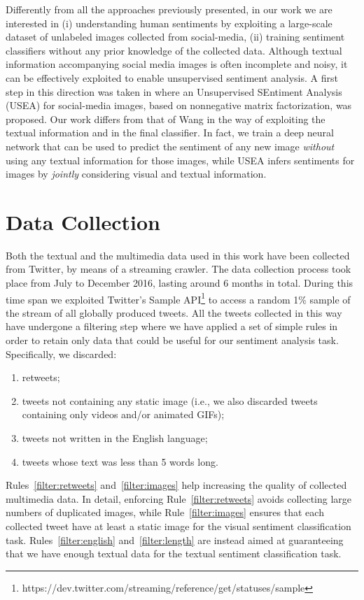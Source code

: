 Differently from all the approaches previously presented, in our work we are interested in (i) understanding human sentiments by exploiting a large-scale dataset of unlabeled images collected from social-media, (ii) training sentiment classifiers without any prior knowledge of the collected data.
Although textual information accompanying social media images is often incomplete and noisy, it can be effectively exploited to enable unsupervised sentiment analysis. A first step in this direction was taken in \cite{wang2015unsupervised} where an Unsupervised SEntiment Analysis (USEA) for social-media images,  based on nonnegative matrix factorization, was proposed. Our work differs from that of Wang \etal \cite{wang2015unsupervised} in the way of exploiting the textual information and in the final classifier. In fact, we train a deep neural network that can be used to predict the sentiment of any {new} image \textit{without} using any textual information for those images, while USEA infers sentiments for images by \textit{jointly} considering visual and textual information. %

\section{Data Collection}
\label{sec:vsa:dataset}
Both the textual and the multimedia data used in this work have been collected from Twitter, by means of a streaming crawler. The data collection process took place from July to December 2016, lasting around 6 months in total. During this time span we exploited Twitter's Sample API\footnote{https://dev.twitter.com/streaming/reference/get/statuses/sample} to access a random 1\% sample of the stream of all globally produced tweets. All the tweets collected in this way have undergone a filtering step where we have applied a set of simple rules in order to retain only data that could be useful for our sentiment analysis task. Specifically, we discarded:
\begin{enumerate}
\item\label{filter:retweets} retweets;
\item\label{filter:images} tweets not containing any static image (i.e., we also discarded tweets containing only videos and/or animated GIFs);
\item\label{filter:english} tweets not written in the English language;
\item\label{filter:length} tweets whose text was less than 5 words long.
\end{enumerate}
Rules~\ref{filter:retweets} and~\ref{filter:images} help increasing the quality of collected multimedia data.
In detail, enforcing Rule~\ref{filter:retweets} avoids collecting large numbers of duplicated images, while Rule~\ref{filter:images} ensures that each collected tweet have at least a static image for the visual sentiment classification task. Rules~\ref{filter:english} and~\ref{filter:length} are instead aimed at guaranteeing that we have enough textual data for the textual sentiment classification task.

